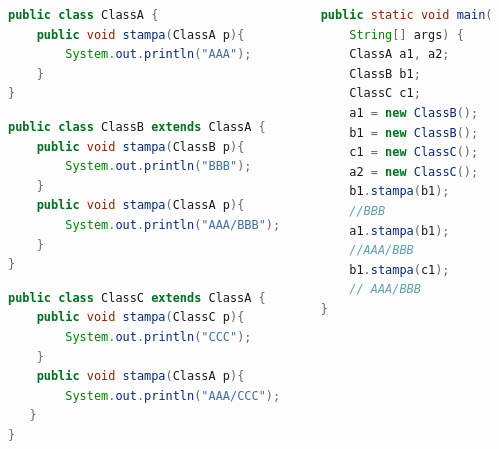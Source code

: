 \documentclass{beamer}
\begin{document}
\begin{frame}[fragile]
\begin{columns}
\begin{column}{0.6\textwidth}
\begin{lstlisting}[language=Java,escapechar=|]
public class ClassA {
    public void stampa(ClassA p){
        System.out.println("AAA");
    }
}
\end{lstlisting}
\begin{lstlisting}[language=Java,escapechar=|]
public class ClassB extends ClassA {
    public void stampa(ClassB p){
        System.out.println("BBB");
    }
    public void stampa(ClassA p){
        System.out.println("AAA/BBB");
    }
}
\end{lstlisting}
\begin{lstlisting}[language=Java,escapechar=|]
public class ClassC extends ClassA {
    public void stampa(ClassC p){
        System.out.println("CCC");
    }
    public void stampa(ClassA p){
        System.out.println("AAA/CCC");
   }
}
\end{lstlisting}
\end{column}
\begin{column}{0.4\textwidth}
\begin{lstlisting}[language=Java,escapechar=|]
public static void main(
    String[] args) {
    ClassA a1, a2;
    ClassB b1;
    ClassC c1;
    a1 = new ClassB();
    b1 = new ClassB();
    c1 = new ClassC();
    a2 = new ClassC();
    b1.stampa(b1); 
    //BBB
    a1.stampa(b1);  
    //AAA/BBB
    b1.stampa(c1); 
    // AAA/BBB
}
\end{lstlisting}
\end{column}
\end{columns}
\end{frame}
\end{document}
